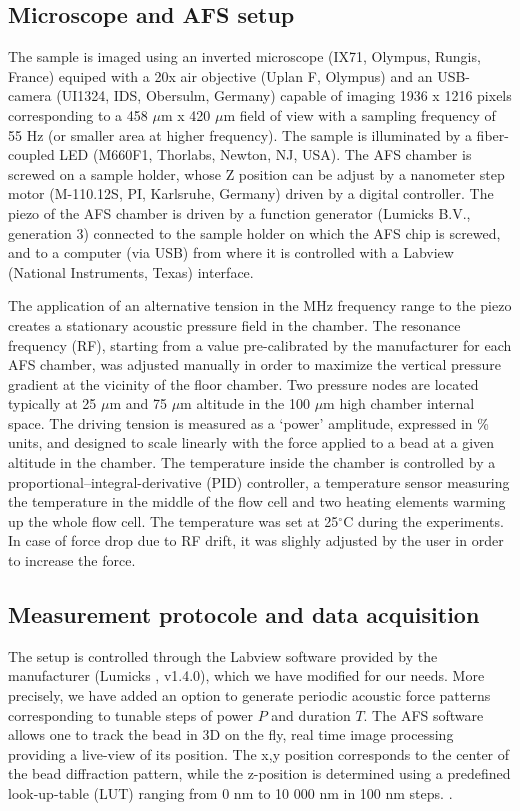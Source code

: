 \documentclass{biophys-new}
\begin{document}
\subsection*{Microscope and AFS setup}

The sample is imaged using an inverted microscope (IX71, Olympus, Rungis, France) equiped with a 20x air objective (Uplan F, Olympus) and an USB-camera (UI1324, IDS, Obersulm, Germany) capable of imaging 1936 x 1216 pixels corresponding to a 458 $\mu$m x 420 $\mu$m field of view with a sampling frequency of 55 Hz (or smaller area at higher frequency). The sample is illuminated by a fiber-coupled LED (M660F1, Thorlabs, Newton, NJ, USA).
The AFS chamber is screwed on a sample holder, whose Z position can be adjust by a nanometer step motor (M-110.12S, PI, Karlsruhe, Germany) driven by a digital controller.
The piezo of the AFS chamber is driven by a function generator (Lumicks B.V., generation 3) connected to the sample holder on which the AFS chip is screwed, and to a computer (via USB) from where it is controlled with a Labview (National Instruments, Texas) interface.

The application of an alternative tension in the MHz frequency range to the piezo creates a stationary acoustic pressure field in the chamber. The resonance frequency (RF), starting from a value pre-calibrated by the manufacturer for each AFS chamber, was adjusted manually in order to maximize the vertical pressure gradient at the vicinity of the floor chamber. Two pressure nodes are located typically at 25 $\mu$m and 75 $\mu$m altitude in the 100 $\mu$m high chamber internal space. The driving tension is measured as a ‘power’ amplitude, expressed in \% units, and designed to scale linearly with the force applied to a bead at a given altitude in the chamber. The temperature inside the chamber is controlled by a proportional–integral-derivative  (PID)  controller, a temperature sensor measuring the  temperature  in  the  middle  of  the  flow  cell and two  heating  elements warming up the whole flow cell. The temperature was set at 25$^{\circ}$C during the experiments. In case of force drop due to RF drift, it was slighly adjusted by the user in order to increase the force.

\subsection*{Measurement protocole and data acquisition}

The setup is controlled through the Labview software provided by the manufacturer (Lumicks , v1.4.0), which we have modified for our needs. More precisely, we have added an option to generate periodic acoustic force patterns corresponding to tunable steps of power $P$ and duration $T$. The AFS software allows one to track the bead in 3D on the fly, real time image processing providing a live-view of its position. The x,y position corresponds to the center of the bead diffraction pattern, while the z-position is determined using a predefined look-up-table (LUT) ranging from 0 nm to 10 000 nm in 100 nm steps. . 
\end{document}
